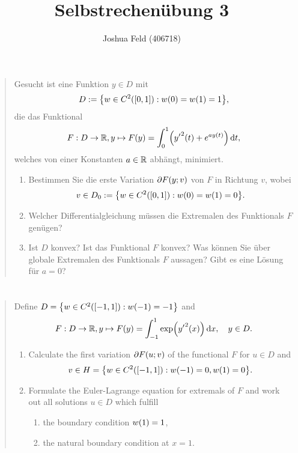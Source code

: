\documentclass{exercise}
\title{Selbstrechenübung 3}
\author{Joshua Feld (406718)}
\begin{document}
	\maketitle


	\section{}

	\begin{quote}
		Gesucht ist eine Funktion \(y \in D\) mit
		\[
			D := \braces*{w \in C^2\parentheses*{\brackets*{0, 1}} : w\parentheses*{0} = w\parentheses*{1} = 1},
		\]
		die das Funktional
		\[
			F: D \to \R, y \mapsto F\parentheses*{y} = \int_0^1 \parentheses*{{y'}^2\parentheses*{t} + e^{ay\parentheses*{t}}}\d t,
		\]
		welches von einer Konstanten \(a \in \mathbb{R}\) abhängt, minimiert.
		\begin{enumerate}
			\item Bestimmen Sie die erste Variation \(\partial F\parentheses*{y; v}\) von \(F\) in Richtung \(v\), wobei
			\[
				v \in D_0 := \braces*{w \in C^2\parentheses*{\brackets*{0, 1}} : w\parentheses*{0} = w\parentheses*{1} = 0}.
			\]
			\item Welcher Differentialgleichung müssen die Extremalen des Funktionals \(F\) genügen?
			\item Ist \(D\) konvex?
			Ist das Funktional \(F\) konvex?
			Was können Sie über globale Extremalen des Funktionals \(F\) aussagen?
			Gibt es eine Lösung für \(a = 0\)?
		\end{enumerate}
	\end{quote}


	\section{}

	\begin{quote}
		Define \(D = \braces*{w \in C^2\parentheses*{\brackets*{-1, 1}} : w\parentheses*{-1} = -1}\) and
		\[
			F: D \to \R, y \mapsto F\parentheses*{y} = \int_{-1}^1 \exp\parentheses*{{y'}^2\parentheses*{x}}\d x, \quad y \in D.
		\]
		\begin{enumerate}
			\item Calculate the first variation \(\partial F\parentheses*{u; v}\) of the functional \(F\) for \(u \in D\) and
			\[
				v \in H = \braces*{w \in C^2\parentheses*{\brackets*{-1, 1}} : w\parentheses*{-1} = 0, w\parentheses*{1} = 0}.
			\]
			\item Formulate the Euler-Lagrange equation for extremals of \(F\) and work out all solutions \(u \in D\) which fulfill
			\begin{enumerate}
				\item the boundary condition \(w\parentheses*{1} = 1\),
				\item the natural boundary condition at \(x = 1\).
			\end{enumerate}
		\end{enumerate}
	\end{quote}
\end{document}
